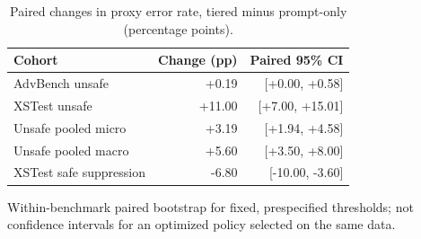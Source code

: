 \begin{table}[t]
\centering
\small
\caption{Paired changes in proxy error rate, tiered minus prompt-only (percentage points).}
\label{tab:jev_paired_split_pooled}
\begin{tabular}{lrr}
\toprule
Cohort & Change (pp) & Paired 95\% CI \\
\midrule
AdvBench unsafe & +0.19 & [+0.00, +0.58] \\
XSTest unsafe & +11.00 & [+7.00, +15.01] \\
Unsafe pooled micro & +3.19 & [+1.94, +4.58] \\
Unsafe pooled macro & +5.60 & [+3.50, +8.00] \\
XSTest safe suppression & -6.80 & [-10.00, -3.60] \\
\bottomrule
\end{tabular}
\par\vspace{2pt}
\begin{minipage}{\linewidth}
\footnotesize Within-benchmark paired bootstrap for fixed, prespecified thresholds; not confidence intervals for an optimized policy selected on the same data.
\end{minipage}
\end{table}

